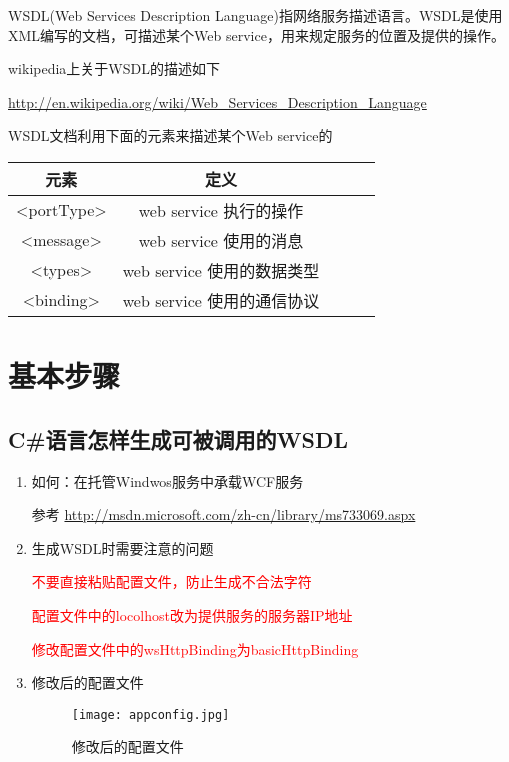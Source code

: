 WSDL(Web Services Description Language)指网络服务描述语言。WSDL是使用XML编写的文档，可描述某个Web service，用来规定服务的位置及提供的操作。

wikipedia上关于WSDL的描述如下

\url{http://en.wikipedia.org/wiki/Web_Services_Description_Language}

WSDL文档利用下面的元素来描述某个Web service的

\begin{table}[h]
	\centering
	\begin{tabular}{ccccc}
		\toprule
		 元素& 定义\tabularnewline
		\midrule
		<portType> & web service 执行的操作\tabularnewline
		<message> & web service 使用的消息\tabularnewline
		<types> & web service 使用的数据类型\tabularnewline
          <binding> & web service 使用的通信协议\tabularnewline
		\bottomrule
	\end{tabular}
\end{table}

\section{基本步骤}

\subsection{C\#语言怎样生成可被调用的WSDL}

\begin{enumerate}

\item 如何：在托管Windwos服务中承载WCF服务

参考 \url{http://msdn.microsoft.com/zh-cn/library/ms733069.aspx}

\item 生成WSDL时需要注意的问题

\textcolor{red}{不要直接粘贴配置文件，防止生成不合法字符}

\textcolor{red}{配置文件中的locolhost改为提供服务的服务器IP地址}

\textcolor{red}{修改配置文件中的wsHttpBinding为basicHttpBinding}

\item 修改后的配置文件

\begin{figure}[htpd]
  \centering
  \texttt{[image: appconfig.jpg]}
  \caption{修改后的配置文件}
\end{figure}
\end{enumerate}

